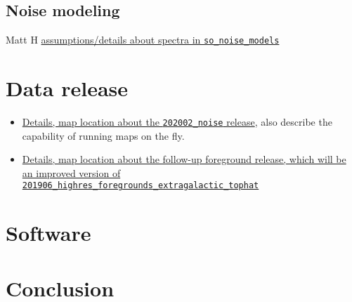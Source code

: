 \documentclass{article}
\begin{document}
\subsection{Noise modeling}

Matt H
\href{https://github.com/simonsobs/so_noise_models}{assumptions/details about spectra in \texttt{so\_noise\_models}}

\section{Data release}

\begin{itemize}
    \item \href{https://github.com/simonsobs/map_based_simulations/tree/master/202002_noise}{Details, map location about the \texttt{202002\_noise} release}, also describe the capability of running maps on the fly.
    \item \href{https://github.com/simonsobs/map_based_simulations/tree/master/201906_highres_foregrounds_extragalactic_tophat}{Details, map location about the follow-up foreground release, which will be an improved version of \texttt{201906\_highres\_foregrounds\_extragalactic\_tophat}}
\end{itemize}


\section{Software}

\section{Conclusion}
\end{document}
